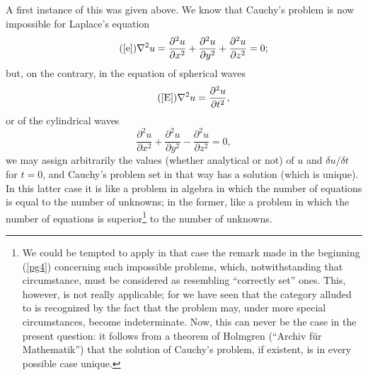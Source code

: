 \documentclass[12pt,oneside]{book}
\begin{document}
A first instance of this was given above. We know that Cauchy's problem is now impossible for Laplace's equation
\begin{equation}
    \tag{\ref{e}}
    \nabla^2u=\frac{\partial^2u}{\partial x^2}+\frac{\partial^2u}{\partial y^2}+\frac{\partial^2u}{\partial z^2}=0;
\end{equation}
but, on the contrary, in the equation of spherical waves
\begin{equation}
    \tag{\ref{E}}
    \nabla^2u=\frac{\partial^2u}{\partial t^2},
\end{equation}
or of the cylindrical waves
\begin{equation}
    \tag{E'}\label{E'}
    \frac{\partial^2u}{\partial x^2}+\frac{\partial^2u}{\partial y^2}-\frac{\partial^2u}{\partial z^2}=0,
\end{equation}
we may assign arbitrarily the values (whether analytical or not) of $u$ and $\delta u/\delta t$ for $t=0$, and Cauchy's problem set in that way has a solution (which is unique). In this latter case it is like a problem in algebra in which the number of equations is equal to the number of unknowns; in the former, like a problem in which the number of equations is superior\footnote{We could be tempted to apply in that case the remark made in the beginning (\ref{pg4}) concerning such impossible problems, which, notwithstanding that circumstance, must be considered as resembling ``correctly set'' ones. This, however, is not really applicable; for we have seen that the category alluded to is recognized by the fact that the problem may, under more special circumstances, become indeterminate. Now, this can never be the case in the present question: it follows from a theorem of Holmgren (``Archiv f\"ur Mathematik'') that the solution of Cauchy's problem, if existent, is in every possible case unique.} to the number of unknowns. \par
\end{document}
